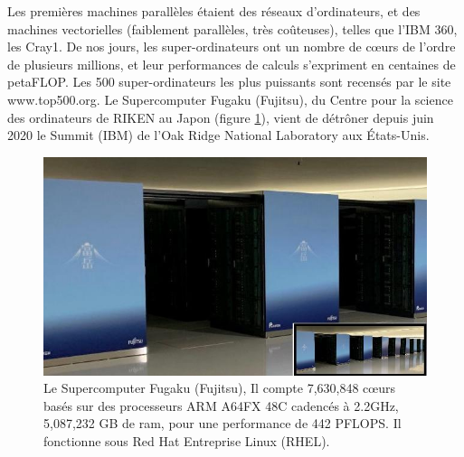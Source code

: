 \documentclass[a4paper,12pt]{report}
\theoremstyle{plain}				%
\theoremstyle{definition}				%
\newcommand{\tdi}[1]{\todo[inline]{{#1}}{}}
\newcommand{\lp}[1]{\todo[author=LP,color=yellow,inline]{#1}}
\begin{document}



Les premières machines parallèles étaient des réseaux
d'ordinateurs, et des machines vectorielles (faiblement
parallèles, très coûteuses), telles que l'IBM 360, les
Cray1. 
De nos jours, les super-ordinateurs ont un nombre de c\oe{}urs de l'ordre de plusieurs millions, et leur performances de calculs s'expriment 
en centaines de petaFLOP. Les 500 super-ordinateurs les plus puissants 
sont recensés par le site www.top500.org. 
Le Supercomputer Fugaku (Fujitsu), du Centre pour la science 
des ordinateurs de RIKEN au Japon (figure \ref{fig:Fugaku}), 
vient de détrôner depuis juin 2020 le Summit (IBM) 
de l’Oak Ridge National Laboratory aux États-Unis.

\bigskip

\begin{figure}
  \includegraphics[width=\columnwidth]{Biblio_PCmax_Rendu_Fugaku.jpg}
\caption{Le Supercomputer Fugaku (Fujitsu), 
  Il compte 7,630,848 c\oe{}urs basés sur des processeurs ARM A64FX
  48C cadencés à 2.2GHz, 5,087,232 GB de ram, pour une performance de 442 PFLOPS. 
  Il fonctionne sous Red Hat Entreprise Linux (RHEL).}
\label{fig:Fugaku}
\end{figure}
\end{document}
